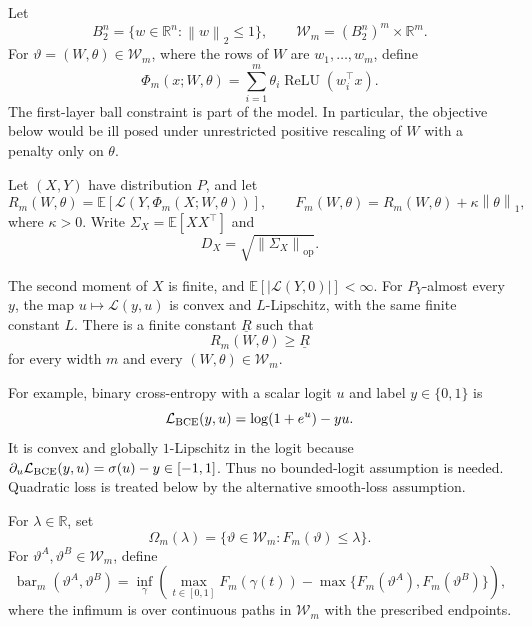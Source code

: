 \documentclass[smallextended,envcountsect]{svjour3}
\newcommand{\relu}{\operatorname{ReLU}}
\newcommand{\E}{\mathbb{E}}
\newcommand{\R}{\mathbb{R}}
\newcommand{\norm}[1]{\left\lVert #1 \right\rVert}
\newcommand{\abs}[1]{\left\lvert #1 \right\rvert}
\newcommand{\SigX}{\Sigma_X}
\begin{document}
Let
\[
B_2^n=\{w\in\R^n:\norm{w}_2\le 1\},
\qquad
\mathcal W_m=(B_2^n)^m\times\R^m.
\]
For $\vartheta=(W,\theta)\in\mathcal W_m$, where the rows of $W$ are $w_1,\ldots,w_m$, define
\begin{equation}
\Phi_m(x;W,\theta)
=\sum_{i=1}^m\theta_i\relu(w_i^\top x).
\label{eq:model}
\end{equation}
The first-layer ball constraint is part of the model. In particular, the objective below would be ill posed under unrestricted positive rescaling of $W$ with a penalty only on $\theta$.

Let $(X,Y)$ have distribution $P$, and let
\begin{equation}
R_m(W,\theta)
=\E\!\left[\mathcal L\!\left(Y,\Phi_m(X;W,\theta)\right)\right],
\qquad
F_m(W,\theta)=R_m(W,\theta)+\kappa\norm{\theta}_1,
\label{eq:objective}
\end{equation}
where $\kappa>0$. Write $\SigX=\E[XX^\top]$ and
\[
D_X=\sqrt{\norm{\SigX}_{\mathrm{op}}}.
\]

\begin{assumption}\label{ass:standing}
The second moment of $X$ is finite, and $\E[\abs{\mathcal L(Y,0)}]<\infty$. For $P_Y$-almost every $y$, the map $u\mapsto\mathcal L(y,u)$ is convex and $L$-Lipschitz, with the same finite constant $L$. There is a finite constant $\underline R$ such that
\[
R_m(W,\theta)\ge \underline R
\]
for every width $m$ and every $(W,\theta)\in\mathcal W_m$.
\end{assumption}

For example, binary cross-entropy with a scalar logit $u$ and label $y\in\{0,1\}$ is
\begin{equation}
\mathcal L_{\rm BCE}(y,u)=\log(1+e^u)-yu.
\label{eq:bce-logit}
\end{equation}
It is convex and globally $1$-Lipschitz in the logit because
$\partial_u\mathcal L_{\rm BCE}(y,u)=\sigma(u)-y\in[-1,1]$.
Thus no bounded-logit assumption is needed. Quadratic loss is treated below by the alternative smooth-loss assumption.

\begin{definition}
For $\lambda\in\R$, set
\[
\Omega_m(\lambda)=\{\vartheta\in\mathcal W_m:F_m(\vartheta)\le\lambda\}.
\]
For $\vartheta^A,\vartheta^B\in\mathcal W_m$, define
\begin{equation}
\operatorname{bar}_m(\vartheta^A,\vartheta^B)
=\inf_{\gamma}\left(
\max_{t\in[0,1]}F_m(\gamma(t))
-\max\{F_m(\vartheta^A),F_m(\vartheta^B)\}
\right),
\label{eq:pair-barrier}
\end{equation}
where the infimum is over continuous paths in $\mathcal W_m$ with the prescribed endpoints.
\end{definition}
\end{document}
